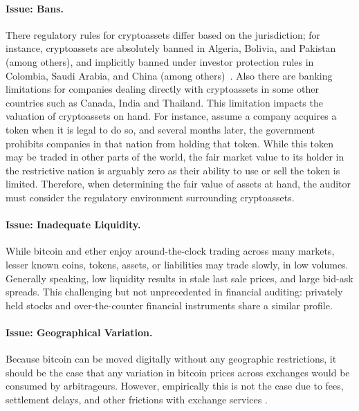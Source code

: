 \paragraph{Issue: Bans.} There regulatory rules for cryptoassets differ based on the jurisdiction; for instance, cryptoassets are absolutely banned in Algeria, Bolivia, and Pakistan (among others), and implicitly banned under investor protection rules in Colombia, Saudi Arabia, and China (among others)~\cite{cryptoLegalityWiki}. Also there are banking limitations for companies dealing directly with cryptoassets in some other countries such as Canada, India and Thailand. This limitation impacts the valuation of cryptoassets on hand. For instance, assume a company acquires a token when it is legal to do so, and several months later, the government prohibits companies in that nation from holding that token. While this token may be traded in other parts of the world, the fair market value to its holder in the restrictive nation is arguably zero as their ability to use or sell the token is limited. Therefore, when determining the fair value of assets at hand, the auditor must consider the regulatory environment surrounding cryptoassets. 

\paragraph{Issue: Inadequate Liquidity.} While bitcoin and ether enjoy around-the-clock trading across many markets, lesser known coins, tokens, assets, or liabilities may trade slowly, in low volumes. Generally speaking, low liquidity results in stale last sale prices, and large bid-ask spreads. This challenging but not unprecedented in financial auditing: privately held stocks and over-the-counter financial instruments share a similar profile.

\paragraph{Issue: Geographical Variation.} Because bitcoin can be moved digitally without any geographic restrictions, it should be the case that any variation in bitcoin prices across exchanges would be consumed by arbitrageurs. However, empirically this is not the case due to fees, settlement delays, and other frictions with exchange services \todo{[cite]}.

